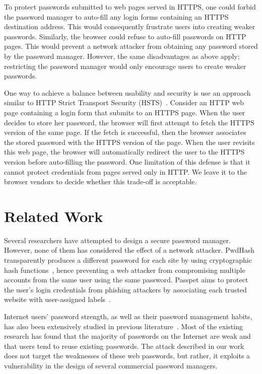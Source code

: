 \documentclass[letterpaper,twocolumn,10pt]{article}
\begin{document}
To protect passwords submitted to web pages served in HTTPS, one could 
forbid the password manager to auto-fill any login forms containing an 
HTTPS destination address. This would consequently frustrate users 
into creating weaker passwords. Similarly, the browser could refuse to 
auto-fill passwords on HTTP pages. This would prevent a network 
attacker from obtaining any password stored by the password manager. 
However, the same disadvantages as above apply; restricting the 
password manager would only encourage users to create weaker 
passwords.

One way to achieve a balance between usability and security is use an 
approach similar to HTTP Strict Transport Security 
(HSTS)~\cite{forcehttps}. Consider an HTTP web page containing a login 
form that submits to an HTTPS page. When the user decides to store her 
password, the browser will first attempt to fetch the HTTPS version of 
the same page. If the fetch is successful, then the browser associates 
the stored password with the HTTPS version of the page. When the user 
revisits this web page, the browser will automatically redirect the 
user to the HTTPS version before auto-filling the password. One 
limitation of this defense is that it cannot protect credentials from 
pages served only in HTTP. We leave it to the browser vendors to 
decide whether this trade-off is acceptable.

\section{Related Work}
\label{sec:related}

Several researchers have attempted to design a secure password manager. However,
none of them has considered the effect of a network attacker. PwdHash transparently 
produces a different password for each site by using cryptographic hash functions~\cite{passhash}, 
hence preventing a web attacker from compromising multiple accounts from the same user
using the same password. Passpet aims to protect the user's login credentials from 
phishing attackers by associating each trusted website with user-assigned labels~\cite{passpet}. 
 
Internet users' password strength, as well as their password management habits, has
also been extensively studied in previous literature~\cite{www07_florencio,pass1,pass2,pass3}. 
Most of the existing research has found that the majority of passwords on the Internet
are weak and that users tend to reuse existing passwords. The attack described in our work does not 
target the weaknesses of these web passwords, but rather, it exploits a vulnerability in the design 
of several commercial password managers.
\end{document}
